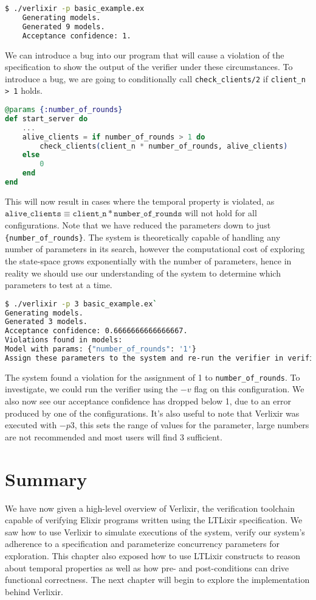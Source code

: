 \begin{lstlisting}[language=bash, xleftmargin=.1\linewidth]
    $ ./verlixir -p basic_example.ex 
    Generating models.
    Generated 9 models.
    Acceptance confidence: 1.
\end{lstlisting}
We can introduce a bug into our program that will cause a violation of the specification to show the output of the verifier under these circumstances. To introduce a bug, we are going to conditionally call \texttt{check\_clients/2} if \texttt{client\_n > 1} holds.
\begin{lstlisting}[language=Elixir, xleftmargin=.1\linewidth]
@params {:number_of_rounds}
def start_server do
    ...
    alive_clients = if number_of_rounds > 1 do
        check_clients(client_n * number_of_rounds, alive_clients)
    else
        0
    end
end
\end{lstlisting}
This will now result in cases where the temporal property is violated, as $\texttt{alive\_clients} \equiv \texttt{client\_n} * \texttt{number\_of\_rounds}$ will not hold for all configurations. Note that we have reduced the parameters down to just \texttt{\{number\_of\_rounds\}}. The system is theoretically capable of handling any number of parameters in its search, however the computational cost of exploring the state-space grows exponentially with the number of parameters, hence in reality we should use our understanding of the system to determine which parameters to test at a time.
\begin{lstlisting}[language=bash, xleftmargin=.1\linewidth]
$ ./verlixir -p 3 basic_example.ex`
Generating models.
Generated 3 models.
Acceptance confidence: 0.6666666666666667.
Violations found in models:
Model with params: {"number_of_rounds": '1'}
Assign these parameters to the system and re-run the verifier in verification mode to gather a trace.
\end{lstlisting}
The system found a violation for the assignment of 1 to \texttt{number\_of\_rounds}. To investigate, we could run the verifier using the $-v$ flag on this configuration. We also now see our acceptance confidence has dropped below 1, due to an error produced by one of the configurations. It's also useful to note that Verlixir was executed with $-p 3$, this sets the range of values for the parameter, large numbers are not recommended and most users will find 3 sufficient. 
\section{Summary}
We have now given a high-level overview of Verlixir, the verification toolchain capable of verifying Elixir programs written using the LTLixir specification. We saw how to use Verlixir to simulate executions of the system, verify our system's adherence to a specification and parameterize concurrency parameters for exploration. This chapter also exposed how to use LTLixir constructs to reason about temporal properties as well as how pre- and post-conditions can drive functional correctness. The next chapter will begin to explore the implementation behind Verlixir.